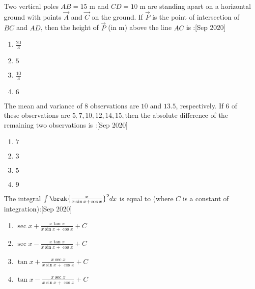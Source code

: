 \item Two vertical poles $ AB = 15 $ m and $CD = 10$ m
are standing apart on a horizontal ground with
points $\vec{A}$ and $\vec{C}$ on the ground. If $\vec{P}$ is the point
of intersection of $BC$ and $AD$, then the height
of $\vec{P}$ (in m) above the line $AC$ is :\hfill{[Sep 2020]}
\begin{enumerate}
\item  $\frac{20}{3}$
\item  $ 5 $
\item  $ \frac{10}{3}$
\item  $ 6 $
\end{enumerate}
\item The mean and variance of 8 observations are $10$ and $13.5$, respectively. If 6 of these observations are $5, 7, 10, 12, 14, 15, $then the absolute difference of the remaining two observations is :\hfill{[Sep 2020]}
\begin{enumerate}
\item $7$
\item $3$
\item $5$ 
\item $9$
\end{enumerate}
\item The integral $\int\brak{\frac{x}{x\sin x+\cos x}}^2 dx$ is equal to (where $C$ is a constant of integration):\hfill{[Sep 2020]}
\begin{enumerate}
    \item $\sec x+\frac{x\tan x}{x\sin x+\cos x}+C$
    \item $\sec x-\frac{x\tan x}{x\sin x+\cos x}+C$
    \item $\tan x+\frac{x\sec x}{x \sin x + \cos x}+C$
    \item $\tan x-\frac{x\sec x}{x\sin x+\cos x}+C$
\end{enumerate}


